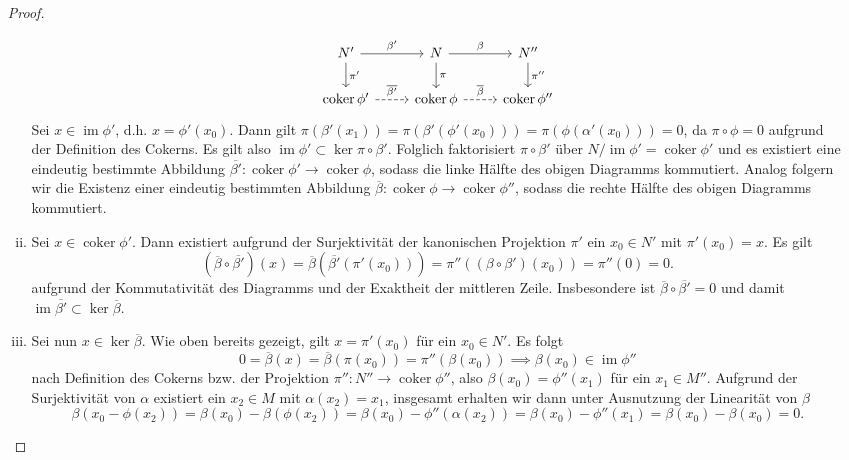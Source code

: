 \documentclass{article}
\newcommand{\im}{\operatorname{im}}
\newcommand{\coker}{\operatorname{coker}}
\begin{document}
\begin{enumerate}[(a)]
\begin{proof}
\begin{enumerate}[(i)]
\[\begin{tikzcd}
                    N' \arrow[d, "\pi'"] \arrow[r, "\beta'"]            & N \arrow[d, "\pi"] \arrow[r, "\beta"]             & N'' \arrow[d, "\pi''"]\\
                    \coker \phi' \arrow[r, dashed, "\overline{\beta'}"] & \coker \phi \arrow[r, dashed, "\overline{\beta}"] & \coker \phi''
                \end{tikzcd}
            \]
            Sei $x \in \im \phi'$, d.h. $x = \phi'(x_0)$. Dann gilt $\pi(\beta'(x_1)) = \pi(\beta'(\phi'(x_0))) = \pi(\phi(\alpha'(x_0))) = 0$, 
            da $\pi\circ \phi = 0$ aufgrund der Definition des Cokerns. Es gilt also $\im \phi' \subset \ker \pi \circ \beta'$.
            Folglich faktorisiert $\pi \circ \beta'$ über $N/\im \phi' = \coker \phi'$ und es existiert eine eindeutig bestimmte Abbildung 
            $\overline{\beta'}\colon \coker \phi' \to \coker \phi$, sodass die linke Hälfte des obigen Diagramms kommutiert. 
            Analog folgern wir die Existenz einer eindeutig bestimmten Abbildung $\overline{\beta} \colon \coker \phi \to \coker \phi''$,
            sodass die rechte Hälfte des obigen Diagramms kommutiert.
            \item Sei $x \in \coker \phi'$. Dann existiert aufgrund der Surjektivität der kanonischen Projektion $\pi'$ ein $x_0 \in N'$ mit $\pi'(x_0) = x$.
            Es gilt 
            \[ 
                (\overline{\beta}\circ \overline{\beta'})(x) = \overline{\beta}(\overline{\beta'}(\pi'(x_0))) = \pi''((\beta\circ\beta')(x_0)) = \pi''(0) = 0.
            \]
            aufgrund der Kommutativität des Diagramms und der Exaktheit der mittleren Zeile.
            Insbesondere ist $\overline{\beta}\circ \overline{\beta'} = 0$ und damit $\im \overline{\beta'} \subset \ker \overline{\beta}$.
            \item Sei nun $x \in \ker \overline{\beta}$. Wie oben bereits gezeigt, gilt $x = \pi'(x_0)$ für ein $x_0\in N'$.
            Es folgt
            \[
                0 = \overline{\beta}(x) = \overline{\beta}(\pi(x_0)) = \pi''(\beta(x_0)) \implies \beta(x_0) \in \im \phi''
            \]
            nach Definition des Cokerns bzw. der Projektion $\pi''\colon N'' \to \coker \phi''$, also $\beta(x_0) = \phi''(x_1)$ für ein $x_1 \in M''$.
            Aufgrund der Surjektivität von $\alpha$ existiert ein $x_2 \in M$ mit $\alpha(x_2) = x_1$, 
            insgesamt erhalten wir dann unter Ausnutzung der Linearität von $\beta$
            \[
               \beta(x_0 - \phi(x_2)) = \beta(x_0) - \beta(\phi(x_2)) = \beta(x_0) - \phi''(\alpha(x_2)) = \beta(x_0) - \phi''(x_1) = \beta(x_0) - \beta(x_0) = 0.
\]
\end{enumerate}
\end{proof}
\end{enumerate}
\end{document}
